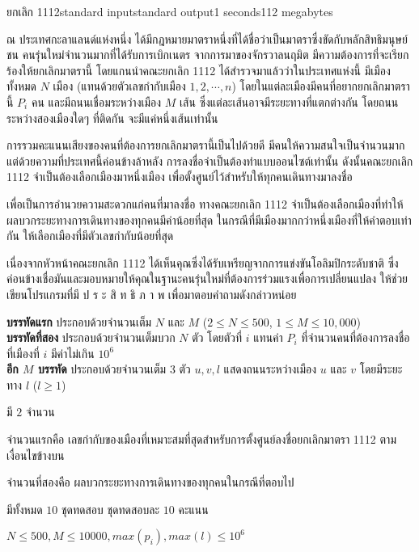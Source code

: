 \documentclass[11pt,a4paper]{article}
\begin{document}
\begin{problem}{ยกเลิก 1112}{standard input}{standard output}{1 seconds}{112 megabytes}

ณ ประเทศกะลาแลนด์แห่งหนึ่ง ได้มีกฎหมายมาตราหนึ่งที่ได้ชื่อว่าเป็นมาตราซึ่งขัดกับหลักสิทธิมนุษย์ชน คนรุ่นใหม่จำนวนมากที่ได้รับการเบิกเนตร จากการมาของจักรวาลนฤมิต มีความต้องการที่จะเรียกร้องให้ยกเลิกมาตรานี้ โดยแกนนำคณะยกเลิก 1112 ได้สำรวจมาแล้วว่าในประเทศแห่งนี้ มีเมืองทั้งหมด $N$ เมือง (แทนด้วยตัวเลขกำกับเมือง $1,2,\cdots,n$) โดยในแต่ละเมืองมีคนที่อยากยกเลิกมาตรานี้ $P_i$ คน และมีถนนเชื่อมระหว่างเมือง $M$ เส้น  ซึ่งแต่ละเส้นอาจมีระยะทางที่แตกต่างกัน โดยถนนระหว่างสองเมืองใดๆ ที่ติดกัน จะมีแค่หนึ่งเส้นเท่านั้น

การรวมคะแนนเสียงของคนที่ต้องการยกเลิกมาตรานี้เป็นไปด้วยดี มีคนให้ความสนใจเป็นจำนวนมาก แต่ด้วยความที่ประเทศนี้ค่อนข้างล้าหลัง การลงชื่อจำเป็นต้องทำแบบออนไซต์เท่านั้น ดังนั้นคณะยกเลิก 1112 จำเป็นต้องเลือกเมืองมาหนึ่งเมือง เพื่อตั้งศูนย์ไว้สำหรับให้ทุกคนเดินทางมาลงชื่อ

เพื่อเป็นการอำนวยความสะดวกแก่คนที่มาลงชื่อ ทางคณะยกเลิก 1112 จำเป็นต้องเลือกเมืองที่ทำให้ ผลบวกระยะทางการเดินทางของทุกคนมีค่าน้อยที่สุด ในกรณีที่มีเมืองมากกว่าหนึ่งเมืองที่ให้คำตอบเท่ากัน ให้เลือกเมืองที่มีตัวเลขกำกับน้อยที่สุด

เนื่องจากหัวหน้าคณะยกเลิก 1112 ได้เห็นคุณซึ่งได้รับเหรียญจากการแข่งขันโอลิมปิกระดับชาติ ซึ่งค่อนข้างเชื่อมันและมอบหมายให้คุณในฐานะคนรุ่นใหม่ที่ต้องการร่วมแรงเพื่อการเปลี่ยนแปลง ให้ช่วยเขียนโปรแกรมที่มี ป ร ะ สิ ท ธิ ภ า พ เพื่อมาตอบคำถามดังกล่าวหน่อย

\InputFile

\textbf{บรรทัดแรก} ประกอบด้วยจำนวนเต็ม $N$ และ $M$  ($2 \leq N \leq 500$, $1 \leq M \leq 10,000$) \\ 
\textbf{บรรทัดที่สอง} ประกอบด้วยจำนวนเต็มบวก $N$ ตัว โดยตัวที่ $i$ แทนค่า $P_i$ ที่จำนวนคนที่ต้องการลงชื่อที่เมืองที่ $i$ มีค่าไม่เกิน $10^6$ \\ 
\textbf{อีก $M$ บรรทัด} ประกอบด้วยจำนวนเต็ม $3$ ตัว $u, v, l$ แสดงถนนระหว่างเมือง $u$ และ $v$ โดยมีระยะทาง $l$ ($l \ge 1$) 

\OutputFile
มี $2$ จำนวน

จำนวนแรกคือ เลขกำกับของเมืองที่เหมาะสมที่สุดสำหรับการตั้งศูนย์ลงชื่อยกเลิกมาตรา 1112 ตามเงื่อนไขข้างบน

จำนวนที่สองคือ ผลบวกระยะทางการเดินทางของทุกคนในกรณีที่ตอบไป

\Scoring
มีทั้งหมด $10$ ชุดทดสอบ ชุดทดสอบละ $10$ คะแนน

$N \le 500, M \le 10000, max(p_i), max(l) \le 10^6$


\end{problem}
\end{document}
